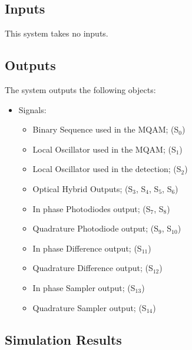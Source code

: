 \subsection*{Inputs}

This system takes no inputs.

\pagebreak
\subsection*{Outputs}

The system outputs the following objects:
\begin{itemize}
\item Signals:
\begin{itemize}
\item Binary Sequence used in the MQAM; (S$_{0}$)
\item Local Oscillator used in the MQAM; (S$_{1}$)
\item Local Oscillator used in the detection; (S$_{2}$)
\item Optical Hybrid Outputs; (S$_{3}$, S$_{4}$, S$_{5}$, S$_{6}$)
\item In phase Photodiodes output; (S$_{7}$, S$_{8}$)
\item Quadrature Photodiode output; (S$_{9}$, S$_{10}$)
\item In phase Difference output; (S$_{11}$)
\item Quadrature Difference output; (S$_{12}$)
\item In phase Sampler output; (S$_{13}$)
\item Quadrature Sampler output; (S$_{14}$)
\end{itemize}
\end{itemize}    





\subsection*{Simulation Results}\label{subsec:SHresults}

